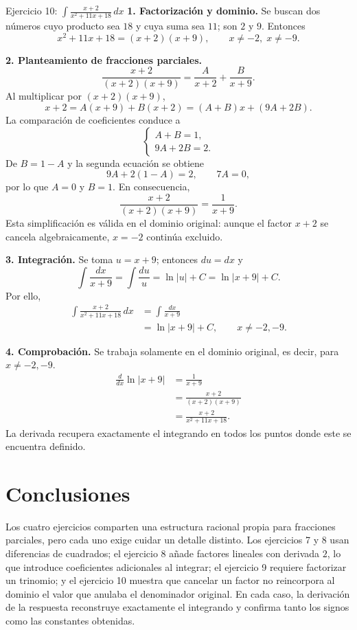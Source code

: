 \begin{examplebox}{Ejercicio 10: $\displaystyle \int\frac{x+2}{x^2+11x+18}\,dx$}
\textbf{1. Factorización y dominio.} Se buscan dos números cuyo producto sea $18$ y cuya suma sea $11$; son $2$ y $9$. Entonces
\[
 x^2+11x+18=(x+2)(x+9),
 \qquad x\ne-2,\;x\ne-9.
\]

\textbf{2. Planteamiento de fracciones parciales.}
\[
 \frac{x+2}{(x+2)(x+9)}
 =\frac{A}{x+2}+\frac{B}{x+9}.
\]
Al multiplicar por $(x+2)(x+9)$,
\[
 x+2=A(x+9)+B(x+2)=(A+B)x+(9A+2B).
\]
La comparación de coeficientes conduce a
\[
 \begin{cases}
 A+B=1,\\
 9A+2B=2.
 \end{cases}
\]
De $B=1-A$ y la segunda ecuación se obtiene
\[
 9A+2(1-A)=2,\qquad 7A=0,
\]
por lo que $A=0$ y $B=1$. En consecuencia,
\[
 \frac{x+2}{(x+2)(x+9)}=\frac1{x+9}.
\]
Esta simplificación es válida en el dominio original: aunque el factor $x+2$ se cancela algebraicamente, $x=-2$ continúa excluido.

\textbf{3. Integración.} Se toma $u=x+9$; entonces $du=dx$ y
\[
 \int\frac{dx}{x+9}=\int\frac{du}{u}
 =\ln|u|+C=\ln|x+9|+C.
\]
Por ello,
\begin{align*}
 \int\frac{x+2}{x^2+11x+18}\,dx
 &=\int\frac{dx}{x+9}\\
 &=\boxed{\ln|x+9|+C},
 \qquad x\ne-2,-9.
\end{align*}

\textbf{4. Comprobación.} Se trabaja solamente en el dominio original, es decir, para $x\ne-2,-9$.
\begin{align*}
 \frac{d}{dx}\ln|x+9|
 &=\frac1{x+9}\\
 &=\frac{x+2}{(x+2)(x+9)}\\
 &=\frac{x+2}{x^2+11x+18}.
\end{align*}
La derivada recupera exactamente el integrando en todos los puntos donde este se encuentra definido.
\end{examplebox}

\section{Conclusiones}
Los cuatro ejercicios comparten una estructura racional propia para fracciones parciales, pero cada uno exige cuidar un detalle distinto. Los ejercicios 7 y 8 usan diferencias de cuadrados; el ejercicio 8 añade factores lineales con derivada $2$, lo que introduce coeficientes adicionales al integrar; el ejercicio 9 requiere factorizar un trinomio; y el ejercicio 10 muestra que cancelar un factor no reincorpora al dominio el valor que anulaba el denominador original. En cada caso, la derivación de la respuesta reconstruye exactamente el integrando y confirma tanto los signos como las constantes obtenidas.

\nocite{openstax2016calculus2}

